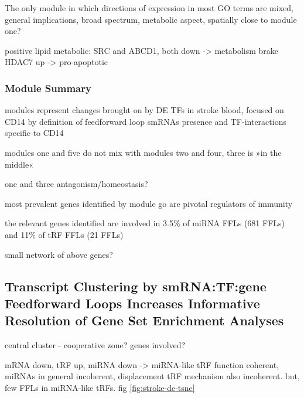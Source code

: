 The only module in which directions of expression in most GO terms are mixed, general implications, broad spectrum, metabolic aspect, spatially close to module one?

positive lipid metabolic: SRC and ABCD1, both down -> metabolism brake
HDAC7 up -> pro-apoptotic

\subsubsection{Module Summary}
modules represent changes brought on by DE TFs in stroke blood, focused on CD14 by definition of feedforward loop smRNAs presence and TF-interactions specific to CD14

modules one and five do not mix with modules two and four, three is »in the middle«

one and three antagonism/homeostasis?

most prevalent genes identified by module go are pivotal regulators of immunity

the relevant genes identified are involved in 3.5\% of miRNA FFLs (681 FFLs) and 11\% of tRF FFLs (21 FFLs)

small network of above genes?

\subsection{Transcript Clustering by smRNA:TF:gene Feedforward Loops Increases Informative Resolution of Gene Set Enrichment Analyses}

central cluster - cooperative zone? genes involved?

mRNA down, tRF up, miRNA down -> miRNA-like tRF function coherent, miRNAs in general incoherent, displacement tRF mechanism also incoherent. but, few FFLs in miRNA-like tRFs. fig \ref{fig:stroke-de-tsne}


